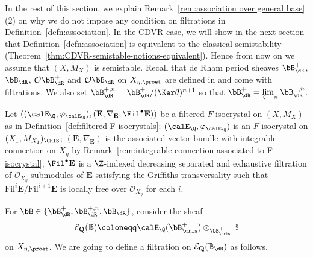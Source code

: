 In the rest of this section, we explain Remark~\ref{rem:association over general base}(2) on why we do not impose any condition on filtrations in Definition~\ref{defn:association}. 
In the CDVR case, we will show in the next section that Definition~\ref{defn:association} is equivalent to the classical semistability (Theorem~\ref{thm:CDVR-semistable-notions-equivalent}). Hence from now on we assume that $(X, M_X)$ is semistable. Recall that de Rham period sheaves $\bB_{\dR}^+$,  $\bB_{\dR}$, $\mathcal{O}\bB_{\dR}^+$ and $\mathcal{O}\bB_{\dR}$ on $X_{\eta, \proet}$ are defined in  \cite[Def.~6.1, 6.8]{scholze-p-adic-hodge} and come with filtrations. We also set $\bB_{\dR}^{+,n}=\bB_{\dR}^+/(\Ker\theta)^{n+1}$ so that $\bB_{\dR}^+=\varprojlim_n\bB_{\dR}^{+,n}$.

\begin{construction} \label{const: filtration-on-BdR}
Let $((\calE_\Q,\varphi_{\calE_\Q}),(\mathbf{E},\nabla_{\mathbf{E}},\Fil^\bullet\mathbf{E}))$ be a filtered $F$-isocrystal on $(X,M_X)$ as in Definition~\ref{def:filtered F-isocrystals}: 
$(\calE_\Q,\varphi_{\calE_\Q})$ is an $F$-isocrystal on $(X_1,M_{X_1})_{\CRIS}$; $(\mathbf{E},\nabla_{\mathbf{E}})$ is the associated vector bundle with integrable connection  on $X_{\eta}$ by Remark~\ref{rem:integrable connection associated to F-isocrystal}; $\Fil^\bullet\mathbf{E}$ is a $\Z$-indexed decreasing separated and exhaustive filtration of $\mathcal{O}_{X_{\eta}}$-submodules of $\mathbf{E}$ satisfying the Griffiths transversality such that $\mathrm{Fil}^i \mathbf{E} / \mathrm{Fil}^{i+1} \mathbf{E}$ is locally free over $\mathcal{O}_{X_{\eta}}$ for each $i$.

For $\bB\in\{\bB^+_\dR, \bB^{+,n}_\dR, \bB_\dR\}$, consider the sheaf 
\[
\mathcal{E}_{\mathbf{Q}}(\mathbb{B}) \coloneqq \calE_\Q(\bB_{\cris}^+)\otimes_{\bB_{\cris}^+} \mathbb{B}
\]
on $X_{\eta,\proet}$. We are going to define a filtration on $\mathcal{E}_{\mathbf{Q}}(\mathbb{B}_{\dR})$ as follows. 


\end{construction}
